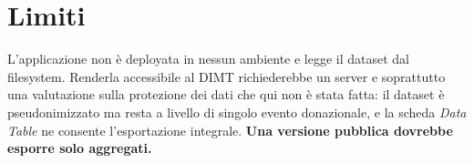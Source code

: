 \section{Limiti}
\label{sec:dash_limits}

L'applicazione non è deployata in nessun ambiente e legge il dataset dal filesystem. 
Renderla accessibile al DIMT richiederebbe un server e soprattutto una valutazione sulla
protezione dei dati che qui non è stata fatta: il dataset è pseudonimizzato ma
resta a livello di singolo evento donazionale, e la scheda \emph{Data Table} ne
consente l'esportazione integrale. \textbf{Una versione pubblica dovrebbe
esporre solo aggregati.}


